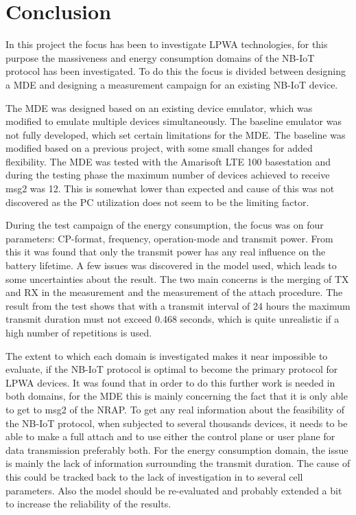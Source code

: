 \chapter{Conclusion}
In this project the focus has been to investigate LPWA technologies, for this purpose the massiveness and energy consumption domains of the NB-IoT protocol has been investigated. To do this the focus is divided between designing a MDE and designing a measurement campaign for an existing NB-IoT device. 

The MDE was designed based on an existing device emulator, which was modified to emulate multiple devices simultaneously. The baseline emulator was not fully developed, which set certain limitations for the MDE. The baseline was modified based on a previous project, with some small changes for added flexibility. The MDE was tested with the Amarisoft LTE 100 basestation and during the testing phase the maximum number of devices achieved to receive msg2 was 12. This is somewhat lower than expected and cause of this was not discovered as the PC utilization does not seem to be the limiting factor. 

During the test campaign of the energy consumption, the focus was on four parameters: CP-format, frequency, operation-mode and transmit power. From this it was found that only the transmit power has any real influence on the battery lifetime. A few issues was discovered in the model used, which leads to some uncertainties about the result. The two main concerns is the merging of TX and RX in the measurement and the measurement of the attach procedure. The result from the test shows that with a transmit interval of 24 hours the maximum transmit duration must not exceed 0.468 seconds, which is quite unrealistic if a high number of repetitions is used. 

The extent to which each domain is investigated makes it near impossible to evaluate, if the NB-IoT protocol is optimal to become the primary protocol for LPWA devices. It was found that in order to do this further work is needed in both domains, for the MDE this is mainly concerning the fact that it is only able to get to msg2 of the NRAP. To get any real information about the feasibility of the NB-IoT protocol, when subjected to several thousands devices, it needs to be able to make a full attach and to use either the control plane or user plane for data transmission preferably both. For the energy consumption domain, the issue is mainly the lack of information surrounding the transmit duration. The cause of this could be tracked back to the lack of investigation in to several cell parameters. Also the model should be re-evaluated and probably extended a bit to increase the reliability of the results. 




